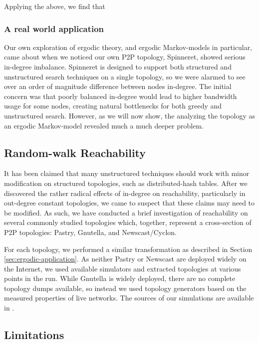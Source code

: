 \documentclass[a4paper,11pt,twocolumn]{article}
\begin{document}
Applying the above, we find that 

\subsubsection{A real world application}

Our own exploration of ergodic theory, and ergodic Markov-models in particular,
came about when we noticed our own P2P topology, Spinneret, showed serious
in-degree imbalance.  Spinneret is designed to support both structured and
unstructured search techniques on a single topology, so we were alarmed to see
over an order of magnitude difference between nodes in-degree.  The initial
concern was that poorly balanced in-degree would lead to higher bandwidth usage
for some nodes, creating natural bottlenecks for both greedy and unstructured
search.  However, as we will now show, the analyzing the topology as an ergodic
Markov-model revealed much a much deeper problem.


\subsection{Random-walk Reachability}

It has been claimed that many unstructured techniques should work with minor
modification on structured topologies, such as distributed-hash tables.  After
we discovered the rather radical effects of in-degree on reachability,
particularly in out-degree constant topologies, we came to suspect that these
claims may need to be modified.  As such, we have conducted a brief
investigation of reachability on several commonly studied topologies which,
together, represent a cross-section of P2P topologies: Pastry, Gnutella, and
Newscast/Cyclon.

For each topology, we performed a similar transformation as described in
Section \ref{sec:ergodic-application}.  As neither Pastry or Newscast are
deployed widely on the Internet, we used available simulators and extracted
topologies at various points in the run.  While Gnutella is widely deployed,
there are no complete topology dumps available, so instead we used topology
generators based on the measured properties of live networks.  The sources of
our simulations are available in \cite{1,2,3}.  %

\subsection{Limitations}
\end{document}
